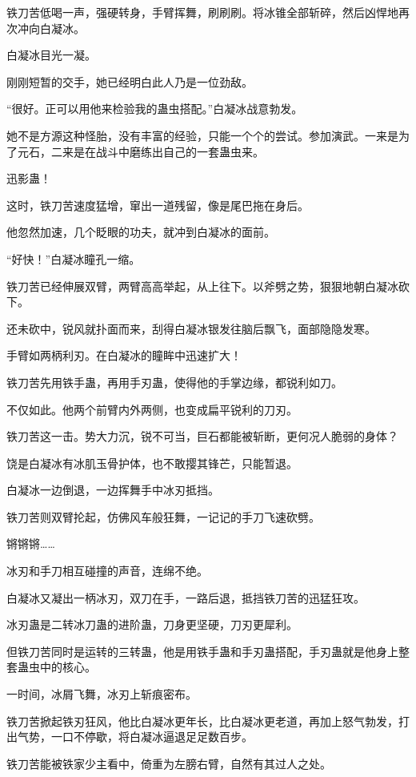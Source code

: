 \begin{this_body}
铁刀苦低喝一声，强硬转身，手臂挥舞，刷刷刷。将冰锥全部斩碎，然后凶悍地再次冲向白凝冰。

白凝冰目光一凝。

刚刚短暂的交手，她已经明白此人乃是一位劲敌。

“很好。正可以用他来检验我的蛊虫搭配。”白凝冰战意勃发。

她不是方源这种怪胎，没有丰富的经验，只能一个个的尝试。参加演武。一来是为了元石，二来是在战斗中磨练出自己的一套蛊虫来。

迅影蛊！

这时，铁刀苦速度猛增，窜出一道残留，像是尾巴拖在身后。

他忽然加速，几个眨眼的功夫，就冲到白凝冰的面前。

“好快！”白凝冰瞳孔一缩。

铁刀苦已经伸展双臂，两臂高高举起，从上往下。以斧劈之势，狠狠地朝白凝冰砍下。

还未砍中，锐风就扑面而来，刮得白凝冰银发往脑后飘飞，面部隐隐发寒。

手臂如两柄利刃。在白凝冰的瞳眸中迅速扩大！

铁刀苦先用铁手蛊，再用手刃蛊，使得他的手掌边缘，都锐利如刀。

不仅如此。他两个前臂内外两侧，也变成扁平锐利的刀刃。

铁刀苦这一击。势大力沉，锐不可当，巨石都能被斩断，更何况人脆弱的身体？

饶是白凝冰有冰肌玉骨护体，也不敢撄其锋芒，只能暂退。

白凝冰一边倒退，一边挥舞手中冰刃抵挡。

铁刀苦则双臂抡起，仿佛风车般狂舞，一记记的手刀飞速砍劈。

锵锵锵……

冰刃和手刀相互碰撞的声音，连绵不绝。

白凝冰又凝出一柄冰刃，双刀在手，一路后退，抵挡铁刀苦的迅猛狂攻。

冰刃蛊是二转冰刀蛊的进阶蛊，刀身更坚硬，刀刃更犀利。

但铁刀苦同时是运转的三转蛊，他是用铁手蛊和手刃蛊搭配，手刃蛊就是他身上整套蛊虫中的核心。

一时间，冰屑飞舞，冰刃上斩痕密布。

铁刀苦掀起铁刃狂风，他比白凝冰更年长，比白凝冰更老道，再加上怒气勃发，打出气势，一口不停歇，将白凝冰逼退足足数百步。

铁刀苦能被铁家少主看中，倚重为左膀右臂，自然有其过人之处。


\end{this_body}
